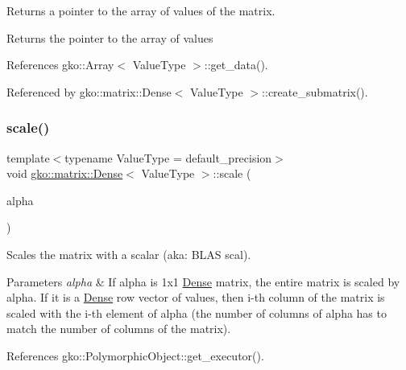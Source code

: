 Returns a pointer to the array of values of the matrix. 

\begin{DoxyReturn}{Returns}
the pointer to the array of values 
\end{DoxyReturn}


References gko\+::\+Array$<$ Value\+Type $>$\+::get\+\_\+data().



Referenced by gko\+::matrix\+::\+Dense$<$ Value\+Type $>$\+::create\+\_\+submatrix().

\mbox{\label{classgko_1_1matrix_1_1Dense_a35cb8dfff52daf3aa8995597d26981ec}} 
\subsubsection{\texorpdfstring{scale()}{scale()}}
{\footnotesize\ttfamily template$<$typename Value\+Type = default\+\_\+precision$>$ \\
void \hyperlink{classgko_1_1matrix_1_1Dense}{gko\+::matrix\+::\+Dense}$<$ Value\+Type $>$\+::scale (\begin{DoxyParamCaption}\item[{const \hyperlink{classgko_1_1LinOp}{Lin\+Op} $\ast$}]{alpha }\end{DoxyParamCaption})\hspace{0.3cm}{\ttfamily [inline]}}



Scales the matrix with a scalar (aka\+: B\+L\+AS scal). 


\begin{DoxyParams}{Parameters}
{\em alpha} & If alpha is 1x1 \hyperlink{classgko_1_1matrix_1_1Dense}{Dense} matrix, the entire matrix is scaled by alpha. If it is a \hyperlink{classgko_1_1matrix_1_1Dense}{Dense} row vector of values, then i-\/th column of the matrix is scaled with the i-\/th element of alpha (the number of columns of alpha has to match the number of columns of the matrix). \\
\hline
\end{DoxyParams}


References gko\+::\+Polymorphic\+Object\+::get\+\_\+executor().

\mbox{\label{classgko_1_1matrix_1_1Dense_a64ea8e876f5390a535a2ef486bd5ab9a}} 
